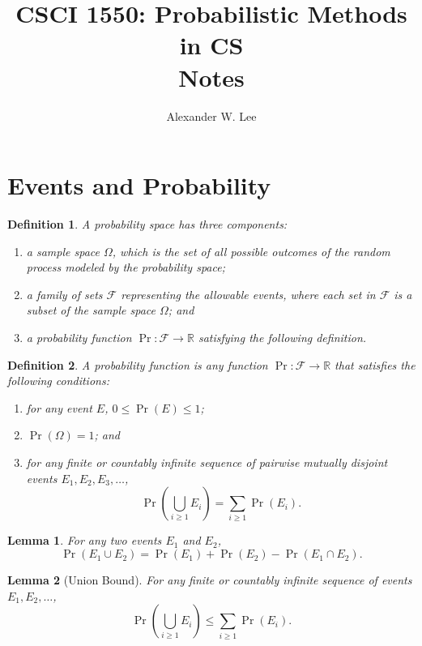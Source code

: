 \documentclass{amsart}
\title{CSCI 1550: Probabilistic Methods in CS \\ \small{Notes}}
\author{Alexander W. Lee}
\newtheorem*{definition}{Definition}
\newtheorem*{lemma}{Lemma}
\newcommand{\R}{\mathbb{R}}
\begin{document}
\maketitle


\section{Events and Probability}

\begin{definition}
  A probability space has three components:
  \begin{enumerate}
    \item a sample space $\Omega$, which is the set of all possible outcomes of
      the random process modeled by the probability space;
    \item a family of sets $\mathcal{F}$ representing the allowable events,
      where each set in $\mathcal{F}$ is a subset of the sample space $\Omega$;
      and
    \item a probability function $\Pr: \mathcal{F} \to \R$ satisfying the
      following definition.
  \end{enumerate}
\end{definition}

\begin{definition}
  A probability function is any function $\Pr: \mathcal{F} \to \R$ that
  satisfies the following conditions:
  \begin{enumerate}
    \item for any event $E$, $0 \leq \Pr(E) \leq 1$;
    \item $\Pr(\Omega) = 1$; and
    \item for any finite or countably infinite sequence of pairwise mutually
      disjoint events $E_1, E_2, E_3, \ldots$,
      \[
        \Pr \left( \bigcup_{i \geq 1} E_i \right) = \sum_{i \geq 1} \Pr(E_i).
      \]
  \end{enumerate}
\end{definition}

\begin{lemma}
  For any two events $E_1$ and $E_2$,
  \[
    \Pr(E_1 \cup E_2) = \Pr(E_1) + \Pr(E_2) - \Pr(E_1 \cap E_2).
  \]
\end{lemma}

\begin{lemma}[Union Bound]
  For any finite or countably infinite sequence of events $E_1, E_2, \ldots$,
  \[
    \Pr \left( \bigcup_{i \geq 1} E_i \right) \leq \sum_{i \geq 1} \Pr(E_i).
  \]
\end{lemma}
\end{document}
